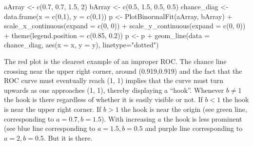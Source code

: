 \documentclass[
]{book}
\newenvironment{Shaded}{\begin{snugshade}}{\end{snugshade}}
\newcommand{\AttributeTok}[1]{\textcolor[rgb]{0.77,0.63,0.00}{#1}}
\newcommand{\DecValTok}[1]{\textcolor[rgb]{0.00,0.00,0.81}{#1}}
\newcommand{\FloatTok}[1]{\textcolor[rgb]{0.00,0.00,0.81}{#1}}
\newcommand{\FunctionTok}[1]{\textcolor[rgb]{0.00,0.00,0.00}{#1}}
\newcommand{\NormalTok}[1]{#1}
\newcommand{\OtherTok}[1]{\textcolor[rgb]{0.56,0.35,0.01}{#1}}
\newcommand{\SpecialCharTok}[1]{\textcolor[rgb]{0.00,0.00,0.00}{#1}}
\newcommand{\StringTok}[1]{\textcolor[rgb]{0.31,0.60,0.02}{#1}}
\begin{document}
\begin{Shaded}
\begin{Highlighting}[]
\NormalTok{  aArray }\OtherTok{\textless{}{-}} \FunctionTok{c}\NormalTok{(}\FloatTok{0.7}\NormalTok{, }\FloatTok{0.7}\NormalTok{, }\FloatTok{1.5}\NormalTok{, }\DecValTok{2}\NormalTok{)}
\NormalTok{  bArray }\OtherTok{\textless{}{-}} \FunctionTok{c}\NormalTok{(}\FloatTok{0.5}\NormalTok{, }\FloatTok{1.5}\NormalTok{, }\FloatTok{0.5}\NormalTok{, }\FloatTok{0.5}\NormalTok{)}
\NormalTok{  chance\_diag }\OtherTok{\textless{}{-}} \FunctionTok{data.frame}\NormalTok{(}\AttributeTok{x =} \FunctionTok{c}\NormalTok{(}\DecValTok{0}\NormalTok{,}\DecValTok{1}\NormalTok{), }\AttributeTok{y =} \FunctionTok{c}\NormalTok{(}\DecValTok{0}\NormalTok{,}\DecValTok{1}\NormalTok{))}
\NormalTok{  p }\OtherTok{\textless{}{-}} \FunctionTok{PlotBinormalFit}\NormalTok{(aArray, bArray) }\SpecialCharTok{+}
    \FunctionTok{scale\_x\_continuous}\NormalTok{(}\AttributeTok{expand =} \FunctionTok{c}\NormalTok{(}\DecValTok{0}\NormalTok{, }\DecValTok{0}\NormalTok{)) }\SpecialCharTok{+} 
    \FunctionTok{scale\_y\_continuous}\NormalTok{(}\AttributeTok{expand =} \FunctionTok{c}\NormalTok{(}\DecValTok{0}\NormalTok{, }\DecValTok{0}\NormalTok{)) }\SpecialCharTok{+}
    \FunctionTok{theme}\NormalTok{(}\AttributeTok{legend.position =} \FunctionTok{c}\NormalTok{(}\FloatTok{0.85}\NormalTok{, }\FloatTok{0.2}\NormalTok{))}
\NormalTok{p }\OtherTok{\textless{}{-}}\NormalTok{ p }\SpecialCharTok{+} \FunctionTok{geom\_line}\NormalTok{(}\AttributeTok{data =}\NormalTok{ chance\_diag, }\FunctionTok{aes}\NormalTok{(}\AttributeTok{x =}\NormalTok{ x, }\AttributeTok{y =}\NormalTok{ y), }\AttributeTok{linetype=}\StringTok{"dotted"}\NormalTok{)}
\end{Highlighting}
\end{Shaded}

The red plot is the clearest example of an improper ROC. The chance line crossing near the upper right corner, around (0.919,0.919) and the fact that the ROC curve must eventually reach (1, 1) implies that the curve must turn upwards as one approaches (1, 1), thereby displaying a ``hook''. Whenever \(b \ne 1\) the hook is there regardless of whether it is easily visible or not. If \(b < 1\) the hook is near the upper right corner. If \(b > 1\) the hook is near the origin (see green line, corresponding to \(a = 0.7, b = 1.5\)). With increasing \(a\) the hook is less prominent (see blue line corresponding to \(a = 1.5, b = 0.5\) and purple line corresponding to \(a = 2, b = 0.5\). But it is there.
\end{document}

